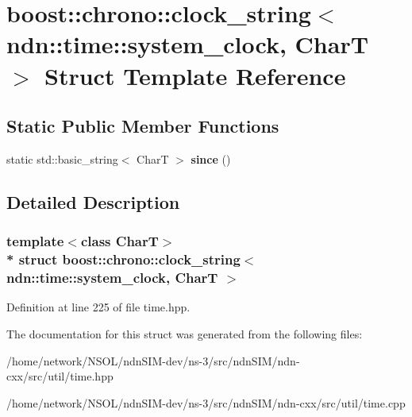 \hypertarget{structboost_1_1chrono_1_1clock__string_3_01ndn_1_1time_1_1system__clock_00_01CharT_01_4}{}\section{boost\+:\+:chrono\+:\+:clock\+\_\+string$<$ ndn\+:\+:time\+:\+:system\+\_\+clock, CharT $>$ Struct Template Reference}
\label{structboost_1_1chrono_1_1clock__string_3_01ndn_1_1time_1_1system__clock_00_01CharT_01_4}
\subsection*{Static Public Member Functions}
\begin{DoxyCompactItemize}
\item 
static std\+::basic\+\_\+string$<$ CharT $>$ {\bfseries since} ()\hypertarget{structboost_1_1chrono_1_1clock__string_3_01ndn_1_1time_1_1system__clock_00_01CharT_01_4_aeecbc5961086c326c1a741a1322b6c37}{}\label{structboost_1_1chrono_1_1clock__string_3_01ndn_1_1time_1_1system__clock_00_01CharT_01_4_aeecbc5961086c326c1a741a1322b6c37}

\end{DoxyCompactItemize}


\subsection{Detailed Description}
\subsubsection*{template$<$class CharT$>$\\*
struct boost\+::chrono\+::clock\+\_\+string$<$ ndn\+::time\+::system\+\_\+clock, Char\+T $>$}



Definition at line 225 of file time.\+hpp.



The documentation for this struct was generated from the following files\+:\begin{DoxyCompactItemize}
\item 
/home/network/\+N\+S\+O\+L/ndn\+S\+I\+M-\/dev/ns-\/3/src/ndn\+S\+I\+M/ndn-\/cxx/src/util/time.\+hpp\item 
/home/network/\+N\+S\+O\+L/ndn\+S\+I\+M-\/dev/ns-\/3/src/ndn\+S\+I\+M/ndn-\/cxx/src/util/time.\+cpp\end{DoxyCompactItemize}
